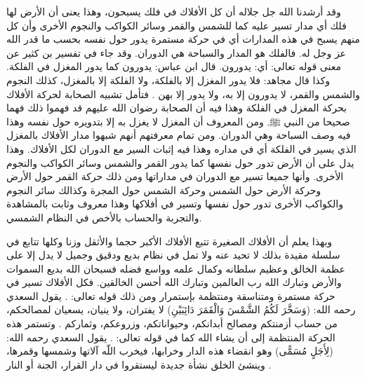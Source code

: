 وقد أرشدنا الله جل جلاله أن كل الأفلاك في فلك يسبحون، وهذا يعنى أن الأرض لها فلك أي مدار تسير عليه كما للشمس والقمر وسائر الكواكب والنجوم الأخرى وأن كل منهم يسبح في هذه المدارات أي في حركة مستمرة يدور حول نفسه بحسب ما قدر الله عز وجل له. فالفلك هو المدار والسباحة هي الدوران. وقد جاء في تفسير بن كثير عن معنى قوله تعالى: \quranayah*[36][40][12] {\footnotesize (\surahname*[36])} أي: يدورون. قال ابن عباس: يدورون كما يدور المغزل في الفلكة. وكذا قال مجاهد: فلا يدور المغزل إلا بالفلكة، ولا الفلكة إلا بالمغزل، كذلك النجوم والشمس والقمر، لا يدورون إلا به، ولا يدور إلا بهن \href{https://shamela.ws/book/8473/2750#p4}{\faExternalLink} \cite{tafsir_ibnKathir}. فتأمل تشبيه الصحابة لحركة الأفلاك بحركة المغزل في الفلكة وهذا فيه أن الصحابة رضوان الله عليهم قد فهموا ذلك فهما صحيحا من النبي ﷺ. ومن المعروف أن المغزل لا يغزل به إلا بتدويره حول نفسه وهذا فيه وصف السباحة وهي الدوران. ومن تمام معرفتهم أنهم شبهوا مدار الأفلاك بالمغزل الذي يسير في الفلكة أي في مداره وهذا فيه إثبات السير مع الدوران لكل الأفلاك. وهذا يدل على أن الأرض تدور حول نفسها كما يدور القمر والشمس وسائر الكواكب والنجوم الأخرى. وأنها جميعا تسير مع الدوران في مداراتها ومن ذلك حركة القمر حول الأرض وحركة الأرض حول الشمس وحركة الشمس حول المجرة وكذالك سائر النجوم والكواكب الأخرى تدور حول نفسها وتسير في أفلاكها وهذا معروف وثابت بالمشاهدة والتجربة والحساب بالأخص في النظام الشمسي. 

وبهذا يعلم أن الأفلاك الصغيرة تتبع الأفلاك الأكبر حجما والأثقل وزنا وكلها تتابع في سلسلة مقيدة بذلك لا تحيد عنه ولا تمل في نظام بديع ودقيق وجميل لا يدل إلا على عظمة الخالق وعظيم سلطانه وكمال علمه وواسع فضله فسبحان الله بديع السموات والأرض وتبارك الله رب العالمين وتبارك الله أحسن الخالقين. فكل الأفلاك تسير في حركة مستمرة ومتناسقة ومنتظمة بإستمرار ومن ذلك قوله تعالى: \quranayah*[14][33]{\footnotesize (\surahname*[14])}. يقول السعدي رحمه الله: (وَسَخَّرَ لَكُمُ الشَّمْسَ وَالْقَمَرَ دَائِبَيْنِ) لا يفتران، ولا ينيان، يسعيان لمصالحكم، من حساب أزمنتكم ومصالح أبدانكم، وحيواناتكم، وزروعكم، وثماركم \href{https://shamela.ws/book/42/905#p5}{\faExternalLink} \cite{tafsir_Saadi}. وتستمر هذه الحركة المنتظمة إلى أن يشاء الله كما في قوله تعالى: \quranayah*[39][5]{\footnotesize (\surahname*[39])}. \href{https://shamela.ws/book/42/905#p5}{\faExternalLink} \cite{tafsir_Saadi} يقول السعدي رحمه الله: (لِأَجَلٍ مُسَمًّى) وهو انقضاء هذه الدار وخرابها، فيخرب اللّه آلاتها وشمسها وقمرها، وينشئ الخلق نشأة جديدة ليستقروا في دار القرار، الجنة أو النار \href{https://shamela.ws/book/42/1623#p4}{\faExternalLink} \cite{tafsir_Saadi}.

